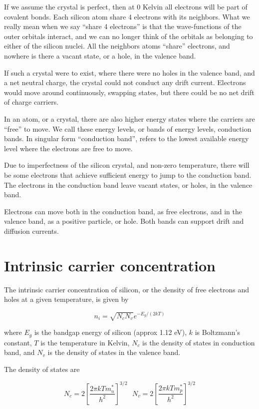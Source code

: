 If we assume the crystal is perfect, then at 0 Kelvin all electrons will
be part of covalent bonds. Each silicon atom share 4 electrons with its
neighbors. What we really mean when we say ``share 4 electrons'' is that
the wave-functions of the outer orbitals interact, and we can no longer
think of the orbitals as belonging to either of the silicon nuclei. All
the neighbors atoms ``share'' electrons, and nowhere is there a vacant
state, or a hole, in the valence band.

If such a crystal were to exist, where there were no holes in the
valence band, and a net neutral charge, the crystal could not conduct
any drift current. Electrons would move around continuously, swapping
states, but there could be no net drift of charge carriers.

In an atom, or a crystal, there are also higher energy states where the
carriers are ``free'' to move. We call these energy levels, or bands of
energy levels, conduction bands. In singular form ``conduction band'',
refers to the lowest available energy level where the electrons are free
to move.

Due to imperfectness of the silicon crystal, and non-zero temperature,
there will be some electrons that achieve sufficient energy to jump to
the conduction band. The electrons in the conduction band leave vacant
states, or holes, in the valence band.

Electrons can move both in the conduction band, as free electrons, and
in the valence band, as a positive particle, or hole. Both bands can
support drift and diffusion currents.

\section{Intrinsic carrier
concentration}\label{intrinsic-carrier-concentration}

The intrinsic carrier concentration of silicon, or the density of free
electrons and holes at a given temperature, is given by

\[
n_i = \sqrt{N_c N_v} e^{-E_g/(2 k T)} 
\tag{1} 
\label{eq:ni}
\]

where \(E_g\) is the bandgap energy of silicon (approx 1.12 eV), \(k\)
is Boltzmann's constant, \(T\) is the temperature in Kelvin, \(N_c\) is
the density of states in conduction band, and \(N_v\) is the density of
states in the valence band.

The density of states are

\[ N_c = 2 \left[\frac{2 \pi  k T m_n^*}{h^2}\right]^{3/2} \text{  } N_v = 2 \left[\frac{2 \pi  k T m_p^*}{h^2}\right]^{3/2} \]

